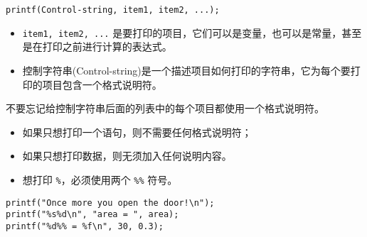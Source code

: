 \begin{frame}[fragile]\ft{\secname}
\begin{free}{}
\lstinline|printf(Control-string, item1, item2, ...);|
\end{free} \vspace{0.1in}

\begin{itemize}
\item \lstinline|item1, item2, ...| 是要打印的项目，它们可以是变量，也可以是常量，甚至是在打印之前进行计算的表达式。\\[0.1in]
\item 控制字符串(Control-string)是一个描述项目如何打印的字符串，它为每个要打印的项目包含一个格式说明符。

\end{itemize}
\end{frame}

\begin{frame}[fragile]\ft{\secname}
\begin{figure}
\centering
{}
\end{figure}
\end{frame}

\begin{frame}[fragile]\ft{\secname}
不要忘记给控制字符串后面的列表中的每个项目都使用一个格式说明符。
\end{frame}

\begin{frame}[fragile]\ft{\secname}
\begin{itemize}
\item 如果只想打印一个语句，则不需要任何格式说明符；\\[0.1in]
\item 如果只想打印数据，则无须加入任何说明内容。\\[0.1in]
\item 想打印 \lstinline|%|，必须使用两个 \lstinline|%%| 符号。
\end{itemize}

\begin{lstlisting}
printf("Once more you open the door!\n");
printf("%s%d\n", "area = ", area);
printf("%d%% = %f\n", 30, 0.3);
\end{lstlisting}
\end{frame}

